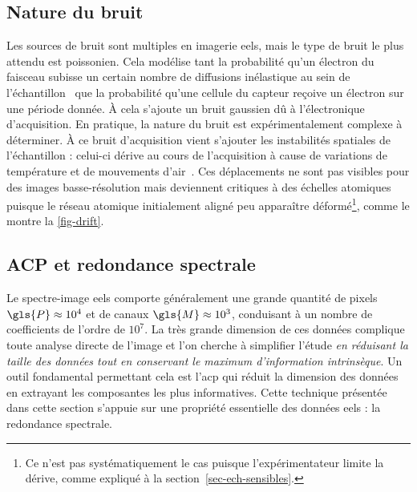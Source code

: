     \subsection{Nature du bruit}\label{sec-nature-bruit}
    
    Les sources de bruit sont multiples en imagerie \gls{eels}, mais le type de bruit le plus attendu est poissonien. Cela modélise tant la probabilité qu'un électron du faisceau subisse un certain nombre de diffusions inélastique au sein de l'échantillon~\cite[Section~4.1.1]{egerton2011electron} que la probabilité qu'une cellule du capteur reçoive un électron sur une période donnée. \`A cela s'ajoute un bruit gaussien dû à l'électronique d'acquisition.
    En pratique, la nature du bruit est expérimentalement complexe à déterminer.
    \`A ce bruit d'acquisition vient s'ajouter les instabilités spatiales de l'échantillon : celui-ci dérive au cours de l'acquisition à cause de variations de température et de mouvements d'air~\cite{zobelli2019spatial}. Ces déplacements ne sont pas visibles pour des images basse-résolution mais deviennent critiques à des échelles atomiques puisque le réseau atomique initialement aligné peu apparaître déformé\footnote{Ce n'est pas systématiquement le cas puisque l'expérimentateur limite la dérive, comme expliqué à la section~\ref{sec-ech-sensibles}.}, comme le montre la \cref{fig-drift}.


    \subsection{ACP et redondance spectrale}\label{sec-acp-redondance}

    Le spectre-image \gls{eels} comporte généralement une grande quantité de pixels $\gls{P}\approx 10^4$ et de canaux $\gls{M}\approx 10^3$, conduisant à un nombre de coefficients de l'ordre de $10^7$. La très grande dimension de ces données complique toute analyse directe de l'image et l'on cherche à simplifier l'étude \emph{en réduisant la taille des données tout en conservant le maximum d'information intrinsèque}. Un outil fondamental permettant cela est l'\gls{acp} qui réduit la dimension des données en extrayant les composantes les plus informatives. Cette technique présentée dans cette section s'appuie sur une propriété essentielle des données \gls{eels} : la redondance spectrale.

